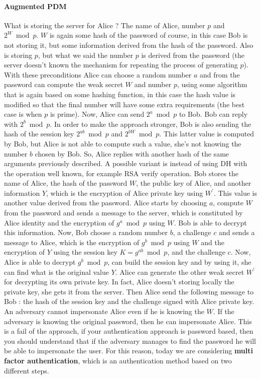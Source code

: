 \documentclass[11pt]{article}
\begin{document}
\paragraph{Augmented PDM} What is storing the server for Alice ? The name of Alice, number $p$ and $2^W \bmod p$. $W$ is again some hash of the password of course, in this case Bob is not storing it, but some information derived from the hash of the password. Also is storing $p$, but what we said the number $p$ is derived from the password (the server doesn't known the mechanism for repeating the process of generating $p$). With these preconditions Alice can choose a random number $a$ and from the password can compute the weak secret $W$ and number $p$, using some algorithm that is again based on some hashing function, in this case the hash value is modified so that the final number will have some extra requirements (the best case is when $p$ is prime). Now, Alice can send $2^a \bmod p$ to Bob. Bob can reply with $2^b \bmod p$. In order to make the approach stronger, Bob is also sending the hash of the session key $2^{ab} \bmod p$ and $2^{bW} \bmod p$. This latter value is computed by Bob, but Alice is not able to compute such a value, she's not knowing the number $b$ chosen by Bob. So, Alice replies with another hash of the same arguments previously described.
A possible variant is instead of using DH with the operation well known, for example RSA verify operation. Bob stores the name of Alice, the hash of the password $W$, the public key of Alice, and another information $Y$, which is the encryption of Alice private key using $W^{'}$. This value is another value derived from the password. Alice starts by choosing $a$, compute $W$ from the password and sends a message to the server, which is constituted by Alice identity and the encryption of $g^a \bmod p$ using $W$. Bob is able to decrypt this information. Now, Bob choose a random number $b$, a challenge $c$ and sends a message to Alice, which is the encryption of $g^b \bmod p$ using $W$ and the encryption of $Y$ using the session key $K = g^{ab} \bmod p$, and the challenge $c$. Now, Alice is able to decrypt $g^b \bmod p$, can build the session key and by using it, she can find what is the original value $Y$. Alice can generate the other weak secret $W^{'}$ for decrypting its own private key. In fact, Alice doesn't storing locally the private key, she gets it from the server. Then Alice send the following message to Bob : the hash of the session key and the challenge signed with Alice private key. An adversary cannot impersonate Alice even if he is knowing the $W$. If the adversary is knowing the original password, then he can impersonate Alice. This is a fail of the approach, if your authentication approach is password based, then you should understand that if the adversary manages to find the password he will be able to impersonate the user. For this reason, today we are considering \textbf{multi factor authentication}, which is an authentication method based on two different steps.
\end{document}

